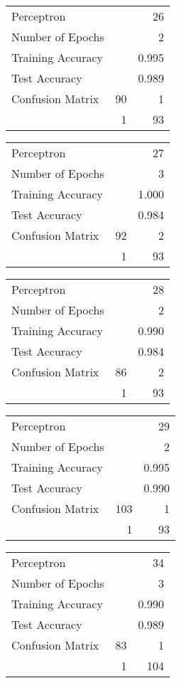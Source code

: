 \documentclass[11pt,twocolumn]{article}
\begin{document}
\begin{center}
\begin{tabular}{l | r r}
Perceptron &&26\\
Number of Epochs & &2\\
Training Accuracy & &0.995\\
Test Accuracy & &0.989\\
Confusion Matrix &90 & 1\\
 &1 & 93\\
\end{tabular}
\end{center}
\begin{center}
\begin{tabular}{l | r r}
Perceptron &&27\\
Number of Epochs & &3\\
Training Accuracy & &1.000\\
Test Accuracy & &0.984\\
Confusion Matrix &92 & 2\\
 &1 & 93\\
\end{tabular}
\end{center}
\begin{center}
\begin{tabular}{l | r r}
Perceptron &&28\\
Number of Epochs & &2\\
Training Accuracy & &0.990\\
Test Accuracy & &0.984\\
Confusion Matrix &86 & 2\\
 &1 & 93\\
\end{tabular}
\end{center}
\begin{center}
\begin{tabular}{l | r r}
Perceptron &&29\\
Number of Epochs & &2\\
Training Accuracy & &0.995\\
Test Accuracy & &0.990\\
Confusion Matrix &103 & 1\\
 &1 & 93\\
\end{tabular}
\end{center}
\begin{center}
\begin{tabular}{l | r r}
Perceptron &&34\\
Number of Epochs & &3\\
Training Accuracy & &0.990\\
Test Accuracy & &0.989\\
Confusion Matrix &83 & 1\\
 &1 & 104\\
\end{tabular}
\end{center}
\end{document}
